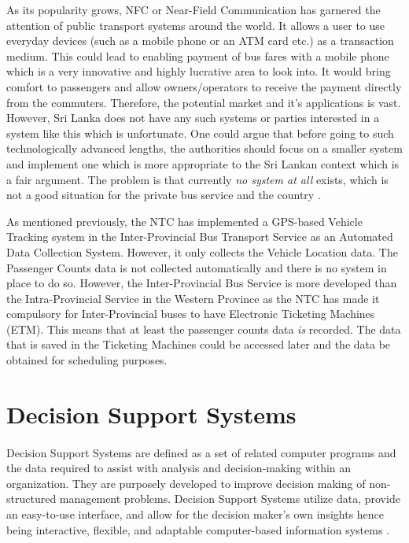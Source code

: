 As its popularity grows, NFC or Near-Field Communication has garnered the attention of public transport systems around the world. It allows a user to use everyday devices (such as a mobile phone or an ATM card etc.) as a transaction medium. This could lead to enabling payment of bus fares with a mobile phone which is a very innovative and highly lucrative area to look into. It would bring comfort to passengers and allow owners/operators to receive the payment directly from the commuters. Therefore, the potential market and it's applications is vast. However, Sri Lanka does not have any such systems or parties interested in a system like this which is unfortunate. One could argue that before going to such technologically advanced lengths, the authorities should focus on a smaller system and implement one which is more appropriate to the Sri Lankan context which is a fair argument. The problem is that currently \textit{no system at all} exists, which is not a good situation for the private bus service and the country \cite{Silva2010, Sinha2012}.

As mentioned previously, the NTC has implemented a GPS-based Vehicle Tracking system in the Inter-Provincial Bus Transport Service as an Automated Data Collection System. However, it only collects the Vehicle Location data. The Passenger Counts data is not collected automatically and there is no system in place to do so. However, the Inter-Provincial Bus Service is more developed than the Intra-Provincial Service in the Western Province as the NTC has made it compulsory for Inter-Provincial buses to have Electronic Ticketing Machines (ETM). This means that at least the passenger counts data \textit{is} recorded. The data that is saved in the Ticketing Machines could be accessed later and the data be obtained for scheduling purposes.

\section{Decision Support Systems}
\label {section-DSS}

\paragraph{ } Decision Support Systems are defined as a set of related computer programs and the data required to assist with analysis and decision-making within an organization. They are purposely developed to improve decision making of non-structured management problems. Decision Support Systems utilize data, provide an easy-to-use interface, and allow for the decision maker’s own insights hence being interactive, flexible, and adaptable computer-based information systems \cite{Turban2005}. 

